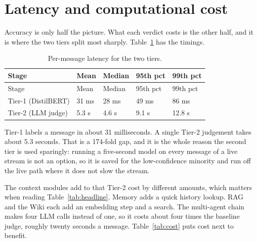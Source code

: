 \section{Latency and computational cost}\label{latency-and-computational-cost}

Accuracy is only half the picture. What each verdict costs is the other half, and it is where the two tiers split most sharply. Table~\ref{tab:latency} has the timings.

\begin{longtable}{@{}lllll@{}}
\caption{Per-message latency for the two tiers.}\label{tab:latency}\tabularnewline
\toprule
Stage & Mean & Median & 95th pct & 99th pct \\
\midrule
\endfirsthead
\toprule
Stage & Mean & Median & 95th pct & 99th pct \\
\midrule
\endhead
\bottomrule
\endlastfoot
Tier-1 (DistilBERT) & 31 ms & 28 ms & 49 ms & 86 ms \\
Tier-2 (LLM judge) & 5.3 s & 4.6 s & 9.1 s & 12.8 s \\
\end{longtable}

Tier-1 labels a message in about 31 milliseconds. A single Tier-2 judgement takes about 5.3 seconds. That is a 174-fold gap, and it is the whole reason the second tier is used sparingly: running a five-second model on every message of a live stream is not an option, so it is saved for the low-confidence minority and run off the live path where it does not slow the stream.

The context modules add to that Tier-2 cost by different amounts, which matters when reading Table~\ref{tab:headline}. Memory adds a quick history lookup. RAG and the Wiki each add an embedding step and a search. The multi-agent chain makes four LLM calls instead of one, so it costs about four times the baseline judge, roughly twenty seconds a message. Table~\ref{tab:cost} puts cost next to benefit.


